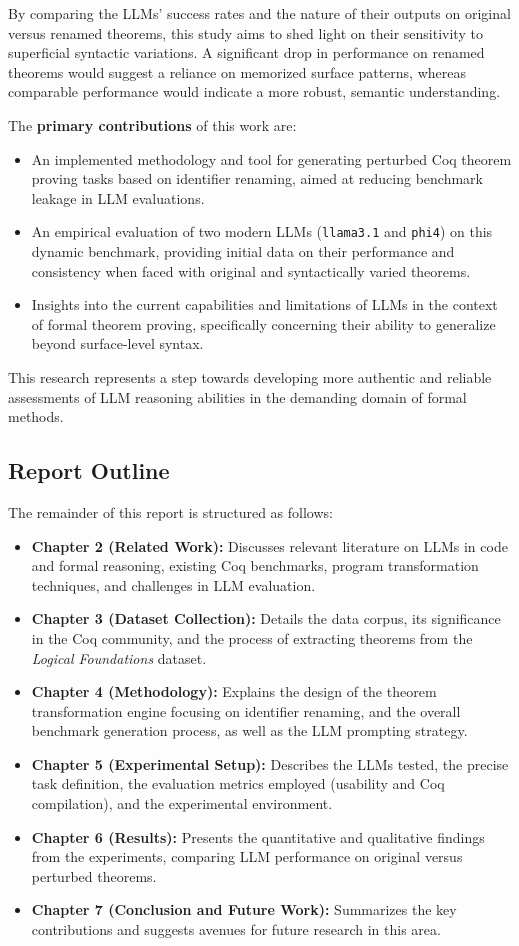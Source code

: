 By comparing the LLMs' success rates and the nature of their outputs on original versus renamed theorems, this study aims to shed light on their sensitivity to superficial syntactic variations. A significant drop in performance on renamed theorems would suggest a reliance on memorized surface patterns, whereas comparable performance would indicate a more robust, semantic understanding.

The \textbf{primary contributions} of this work are:
\begin{itemize}
    \item An implemented methodology and tool for generating perturbed Coq theorem proving tasks based on identifier renaming, aimed at reducing benchmark leakage in LLM evaluations.
    \item An empirical evaluation of two modern LLMs (\texttt{llama3.1} and \texttt{phi4}) on this dynamic benchmark, providing initial data on their performance and consistency when faced with original and syntactically varied theorems.
    \item Insights into the current capabilities and limitations of LLMs in the context of formal theorem proving, specifically concerning their ability to generalize beyond surface-level syntax.
\end{itemize}

This research represents a step towards developing more authentic and reliable assessments of LLM reasoning abilities in the demanding domain of formal methods.

\subsection{Report Outline}
\label{sec:intro_outline}

The remainder of this report is structured as follows:
\begin{itemize}
    \item \textbf{Chapter 2 (Related Work):} Discusses relevant literature on LLMs in code and formal reasoning, existing Coq benchmarks, program transformation techniques, and challenges in LLM evaluation.
    \item \textbf{Chapter 3 (Dataset Collection):} Details the data corpus, its significance in the Coq community, and the process of extracting theorems from the \emph{Logical Foundations} dataset.
    \item \textbf{Chapter 4 (Methodology):} Explains the design of the theorem transformation engine focusing on identifier renaming, and the overall benchmark generation process, as well as the LLM prompting strategy.
    \item \textbf{Chapter 5 (Experimental Setup):} Describes the LLMs tested, the precise task definition, the evaluation metrics employed (usability and Coq compilation), and the experimental environment.
    \item \textbf{Chapter 6 (Results):} Presents the quantitative and qualitative findings from the experiments, comparing LLM performance on original versus perturbed theorems.
    \item \textbf{Chapter 7 (Conclusion and Future Work):} Summarizes the key contributions and suggests avenues for future research in this area.
\end{itemize}